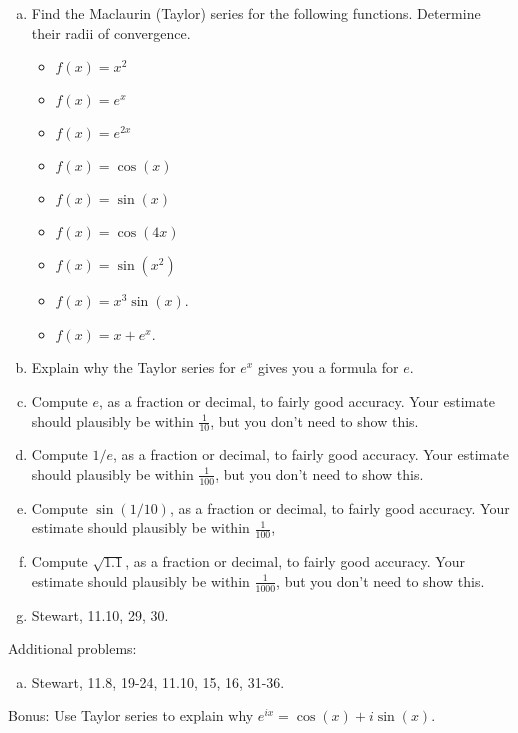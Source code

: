 \documentclass[12pt]{article}
\begin{document}
\begin{enumerate}[(a)]
\item
Find the Maclaurin (Taylor) series for the following functions. Determine their radii of convergence.
\begin{itemize}
\item $f(x) = x^2$
\item $f(x) = e^x$
\item $f(x) = e^{2x}$
\item $f(x) = \cos(x)$
\item $f(x) = \sin(x)$
\item $f(x) = \cos(4x)$
\item $f(x) = \sin(x^2)$
\item $f(x) = x^3 \sin(x)$.
\item $f(x) = x + e^x$.
\end{itemize}
\item
Explain why the Taylor series for $e^x$ gives you a formula for $e$.
\item
Compute $e$, as a fraction or decimal, to fairly good accuracy. Your estimate should plausibly be within $\frac{1}{10}$, but you don't need to show this.
\item
Compute $1/e$, as a fraction or decimal, to fairly good accuracy. Your estimate should plausibly be within $\frac{1}{100}$,
but you don't need to show this.
\item
Compute $\sin(1/10)$, as a fraction or decimal, to fairly good accuracy. Your estimate should plausibly be within $\frac{1}{100}$,
\item
Compute $\sqrt{1.1}$, as a fraction or decimal, 
to fairly good accuracy. Your estimate should plausibly be within $\frac{1}{1000}$,
but you don't need to show this.
\item
Stewart, 11.10, 29, 30.
\end{enumerate}
Additional problems:
\begin{enumerate}[(a)]
\item
Stewart, 11.8, 19-24, 11.10, 15, 16, 31-36.

\end{enumerate}
Bonus: Use Taylor series to explain why $e^{ix} = \cos(x) + i \sin(x)$.
\\
\\
\end{document}
